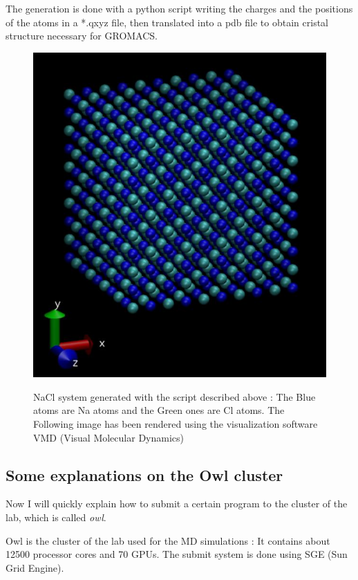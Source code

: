 \documentclass[11pt,twoside,a4paper]{report}
\begin{document}
The generation is done with a python script writing the charges and the positions of the atoms in a *.qxyz file, then translated into a pdb file to obtain cristal structure necessary for GROMACS.

\begin{figure}[H]
	   \includegraphics[scale=0.4]{nacl}
	   \label{fig:nacl_system}
    \centering 
    \caption{NaCl system generated with the script described above : The Blue atoms are Na atoms and the Green ones are Cl atoms. The Following image has been rendered using the visualization software VMD (Visual Molecular Dynamics)}    
   \end{figure}  


\subsection{Some explanations on the Owl cluster}

Now I will quickly explain how to submit a certain program to the cluster of the lab, which is called \textit{owl}.

Owl is the cluster of the lab used for the MD simulations : It contains about 12500 processor cores and 70 GPUs. The submit system is done using SGE (Sun Grid Engine).  
\end{document}
